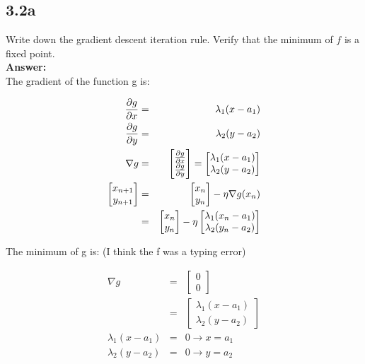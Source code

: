 \documentclass[a4paper]{article}
\begin{document}
\subsection*{3.2a}

Write down the gradient descent iteration rule. Verify that the minimum of $f$ is a fixed point.\\

\textbf{Answer:}\\

The gradient of the function g is:

\begin{eqnarray}
\pdv{g}{x} &=& \lambda_1(x-a_1)\\
\pdv{g}{y} &=& \lambda_2(y-a_2)\\
\nabla g &=& \begin{bmatrix}
\pdv{g}{x}\\
\pdv{g}{y}
\end{bmatrix} = \begin{bmatrix}
\lambda_1 (x-a_1)\\
\lambda_2 (y-a_2)
\end{bmatrix}\\
\begin{bmatrix}
x_{n+1}\\
y_{n+1}
\end{bmatrix} &=& \begin{bmatrix}
x_n\\
y_n
\end{bmatrix} -  \eta \nabla g(x_n)\\
&=& \begin{bmatrix}
x_n\\
y_n
\end{bmatrix} - \eta \begin{bmatrix}
\lambda_1 (x_n-a_1)\\
\lambda_2 (y_n-a_2)
\end{bmatrix}
\end{eqnarray}

The minimum of g is: (I think the f was a typing error)

\begin{eqnarray}
\nabla g  &=& \begin{bmatrix}
0\\
0
\end{bmatrix}\\
&=& \begin{bmatrix}
\lambda_1 (x-a_1)\\
\lambda_2 (y-a_2)
\end{bmatrix}\\
\lambda_1 (x-a_1) &=& 0 \rightarrow x = a_1\\
\lambda_2 (y-a_2) &=& 0 \rightarrow y = a_2\\
\end{eqnarray}
\end{document}
